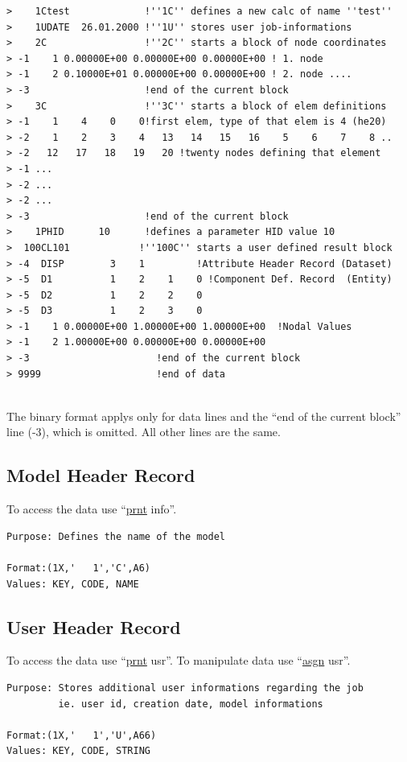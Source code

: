 \documentclass{article}
\providecommand{\htmlref}[2]{\hyperref[#2]{#1}}
\begin{document}
\begin{verbatim}
>    1Ctest             !''1C'' defines a new calc of name ''test''
>    1UDATE  26.01.2000 !''1U'' stores user job-informations
>    2C                 !''2C'' starts a block of node coordinates
> -1    1 0.00000E+00 0.00000E+00 0.00000E+00 ! 1. node
> -1    2 0.10000E+01 0.00000E+00 0.00000E+00 ! 2. node ....
> -3                    !end of the current block
>    3C                 !''3C'' starts a block of elem definitions
> -1    1    4    0    0!first elem, type of that elem is 4 (he20)
> -2    1    2    3    4   13   14   15   16    5    6    7    8 ..
> -2   12   17   18   19   20 !twenty nodes defining that element
> -1 ...
> -2 ...
> -2 ...
> -3                    !end of the current block
>    1PHID      10      !defines a parameter HID value 10
>  100CL101            !''100C'' starts a user defined result block
> -4  DISP        3    1         !Attribute Header Record (Dataset)
> -5  D1          1    2    1    0 !Component Def. Record  (Entity)
> -5  D2          1    2    2    0
> -5  D3          1    2    3    0
> -1    1 0.00000E+00 1.00000E+00 1.00000E+00  !Nodal Values
> -1    2 1.00000E+00 0.00000E+00 0.00000E+00
> -3                      !end of the current block
> 9999                    !end of data
 
\end{verbatim}
The binary format applys only for data lines and the ``end of the current block'' line (-3), which is omitted.
All other lines are the same.

\subsection{\label{Model Header Record}Model Header Record}
To access the data use ``\htmlref{prnt}{prnt} info''.
\begin{verbatim}
Purpose: Defines the name of the model

Format:(1X,'   1','C',A6)  
Values: KEY, CODE, NAME
\end{verbatim}

\subsection{\label{User Header Record}User Header Record}
To access the data use ``\htmlref{prnt}{prnt} usr''.
To manipulate data use ``\htmlref{asgn}{asgn} usr''.
\begin{verbatim}
Purpose: Stores additional user informations regarding the job
         ie. user id, creation date, model informations

Format:(1X,'   1','U',A66)  
Values: KEY, CODE, STRING
\end{verbatim}
\end{document}
